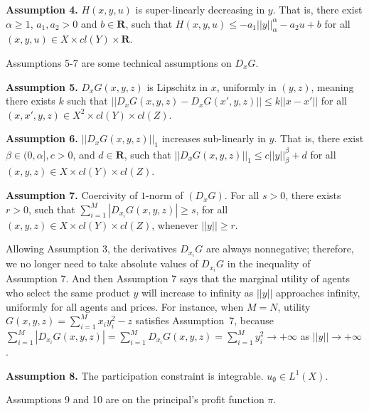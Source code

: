 \documentclass[a4paper, 11pt]{amsart}
\numberwithin{equation}{section}
\theoremstyle{plain}
\theoremstyle{definition}
\theoremstyle{remark}
\newcommand{\R}{\mathbf{R}}
\begin{document}
{\bf Assumption 4.} $H(x,y,u)$ is super-linearly decreasing in $y$. That is, there exist $\alpha \ge 1$, $a_1, a_2> 0$ and $b\in \R$, such that $H(x, y, u)\le -a_1 ||y||_{\alpha}^{\alpha} - a_2 u +b$ for all $ (x, y, u)\in X\times cl(Y)\times \R$.\medskip



Assumptions 5-7 are some technical assumptions on $D_xG$.\medskip

{\bf Assumption 5.} {$D_x G(x,y,z)$ is Lipschitz in $x$},
uniformly in $(y,z)$, meaning there exists $k$ such that
 $||D_xG(x,y,z)-D_x G(x',y,z)||\le k||x-x'||$ %
for all $(x, x',y, z)\in X^2\times cl(Y) \times cl(Z)$.\medskip




{\bf Assumption 6.}  $||D_x G(x,y,z)||_{1}$ increases sub-linearly in $y$. That is, there exist $ \beta \in (0, \alpha], c>0$, and $ d\in \R$, such that $||D_x G(x,y,z)||_{1}\le c||y||_{\beta}^{\beta} +d$ for all $ (x, y, z)\in X\times cl(Y) \times cl(Z)$.\medskip




{\bf Assumption 7.} Coercivity of {$1$-norm} of $(D_xG)$. For all $ s>0$, there exists $r>0$, such that $\sum_{i=1}^{M} |D_{x_i}G(x,y,z)|\ge s$, for all $(x, y, z)\in X\times  cl(Y) \times cl(Z)$, whenever $||y||\ge r$.\medskip

{Allowing Assumption 3, {the derivatives $D_{x_i}G$ are always nonnegative; therefore,} we no longer need to take absolute values of $D_{x_i}G$ in the inequality of Assumption 7.} And then Assumption 7 says that the marginal utility of agents who select the same product $y$ will increase to infinity as $||y||$ approaches infinity, uniformly for all agents and prices. {For instance, when $M = N$, utility $G(x,y,z) = \sum_{i=1}^{M} x_iy_i^2 -z $ satisfies Assumption~7, because $\sum_{i=1}^{M} |D_{x_i}G(x,y,z)| = \sum_{i=1}^{M} D_{x_i}G(x,y,z) = \sum_{i=1}^{M} y_i^2 \rightarrow +\infty$ as $||y|| \rightarrow + \infty$. }\medskip

{\bf Assumption 8.} The participation constraint {is integrable.} %
{$u_{\emptyset}\in L^{1}(X)$.}\medskip



Assumptions 9 and 10 are on the principal's profit function $\pi$. 

\end{document}

